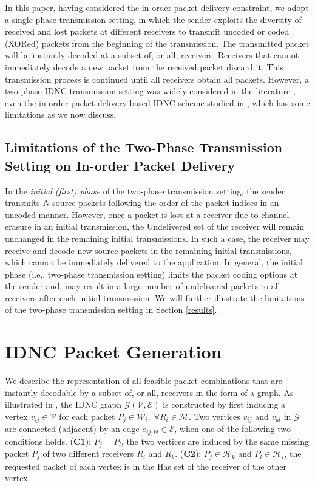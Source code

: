 \documentclass[12pt, peerreview, onecolumn]{IEEEtran}
\begin{document}
In this paper, having considered the in-order packet delivery constraint, we adopt a single-phase transmission setting, in which the sender exploits the diversity of received and lost packets at different receivers to transmit uncoded  or coded (XORed) packets from the beginning of the transmission. The transmitted packet will be instantly decoded at a subset of, or all,  receivers. Receivers that  cannot immediately decode a new packet from the received packet discard it. This  transmission process is  continued until all receivers obtain all packets. However, a  two-phase IDNC transmission  setting was  widely considered in the literature   \cite{sorour2012completion,aboutorabenabling,sadeghi2010optimal,sorour2010decoding,le2013instantly}, even the in-order packet delivery based IDNC scheme studied in \cite{wanginstantly}, which has some limitations as we now discuss.  \vspace{-6mm}
\subsection{Limitations   of the  Two-Phase  Transmission Setting  on In-order Packet Delivery} \label{sec:initial}
In the  \emph{initial (first) phase} of the two-phase transmission setting, the sender  transmits $N$ source packets following the order of the packet indices in an uncoded manner. However, once a packet is lost at a receiver  due to channel  erasure in an initial transmission, the Undelivered set of the receiver will remain unchanged in the remaining initial transmissions. In such a case, the receiver may receive and decode new source packets in the remaining initial transmissions, which cannot be immediately delivered to the application. In general,   the initial  phase (i.e., two-phase transmission setting) limits the packet coding options at the sender and, may result in a large number of undelivered packets to all receivers after each initial transmission. We will further illustrate the limitations of the  two-phase transmission setting  in Section \ref{results}.






\vspace{-5mm}
\section{IDNC Packet Generation} \label{graph}
We describe the representation of all  feasible packet combinations that are instantly decodable by a subset of, or  all,  receivers   in the form of a graph. As illustrated in \cite{sorour2010decoding,sorour2012completion}, the IDNC graph $\mathcal{G(\mathcal V, \mathcal E)}$ is constructed  by first inducing a vertex $v_{ij} \in \mathcal V$ for each packet $P_j\in \mathcal{W}_i, \; \forall R_i\in \mathcal{M}$. Two vertices $v_{ij}$ and $v_{kl}$ in $\mathcal{G}$  are connected (adjacent)  by an edge $e_{ij,kl}\in \mathcal E$, when one of the following two conditions holds. (\textbf{C1}): $P_j = P_l$, the two vertices are induced by the same missing  packet $P_j$ of two different receivers $R_i$ and $R_k$. (\textbf{C2}): $P_j\in \mathcal{H}_k$ and $P_l\in \mathcal{H}_i$, the requested packet of each vertex is in the Has set of the receiver of the other vertex.
\end{document}
